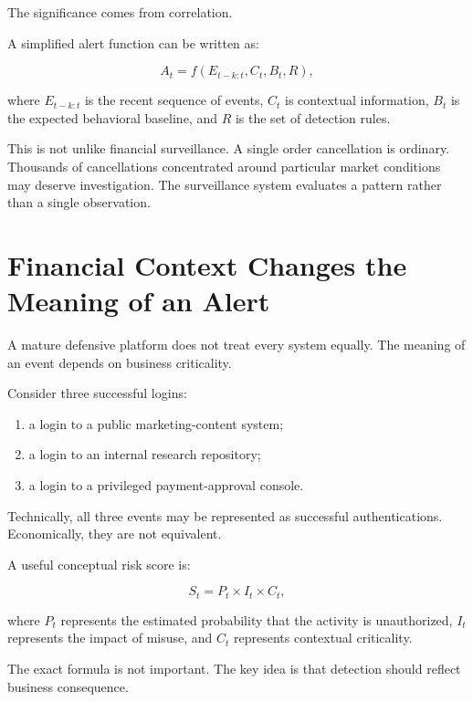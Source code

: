 The significance comes from correlation.

A simplified alert function can be written as:

\begin{equation}
A_t =
f(E_{t-k:t}, C_t, B_t, R),
\end{equation}

where \(E_{t-k:t}\) is the recent sequence of events, \(C_t\) is contextual information, \(B_t\) is the expected behavioral baseline, and \(R\) is the set of detection rules.

This is not unlike financial surveillance. A single order cancellation is ordinary. Thousands of cancellations concentrated around particular market conditions may deserve investigation. The surveillance system evaluates a pattern rather than a single observation.

\section{Financial Context Changes the Meaning of an Alert}

A mature defensive platform does not treat every system equally. The meaning of an event depends on business criticality.

Consider three successful logins:

\begin{enumerate}
    \item a login to a public marketing-content system;
    \item a login to an internal research repository;
    \item a login to a privileged payment-approval console.
\end{enumerate}

Technically, all three events may be represented as successful authentications. Economically, they are not equivalent.

A useful conceptual risk score is:

\begin{equation}
S_t =
P_t \times I_t \times C_t,
\end{equation}

where \(P_t\) represents the estimated probability that the activity is unauthorized, \(I_t\) represents the impact of misuse, and \(C_t\) represents contextual criticality.

The exact formula is not important. The key idea is that detection should reflect business consequence.

